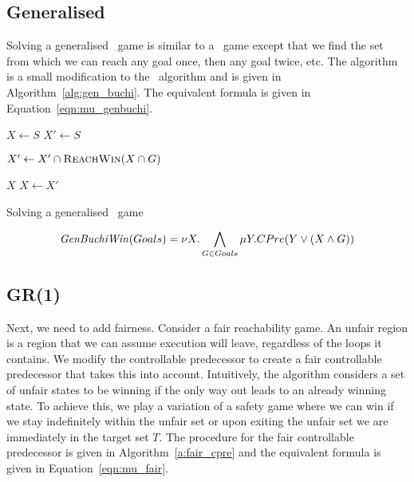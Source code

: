 \subsection{Generalised \buchi}

Solving a generalised \buchi\ game is similar to a \buchi\ game except that we find the set from which we can reach any goal once, then any goal twice, etc. The algorithm is a small modification to the \buchi\ algorithm and is given in Algorithm~\ref{alg:gen_buchi}. The equivalent \mucalc formula is given in Equation~\ref{eqn:mu_genbuchi}.

\begin{algorithm}[t]
\begin{algorithmic}
\State $X \gets S$
\Loop
\State $X' \gets S$

\State $X' \gets X' \cap \Call{\reachFun}{X \cap G}$
\EndFor

\State\Return $X$\EndIf
\State $X \gets X'$

\EndLoop
\EndFunction
\end{algorithmic}
\caption{Solving a generalised \buchi\ game}
\label{alg:gen_buchi}
\end{algorithm}

\begin{equation}
    \mathit{GenBuchiWin}(Goals) = \nu X. \bigwedge_{G \in Goals} \mu Y. CPre(Y \vee (X \wedge G))
\label{eqn:mu_genbuchi}
\end{equation}

\subsection{GR(1)}

Next, we need to add fairness. Consider a fair reachability game. An unfair region is a region that we can assume execution will leave, regardless of the loops it contains. We modify the controllable predecessor to create a fair controllable predecessor that takes this into account. Intuitively, the algorithm considers a set of unfair states to be winning if the only way out leads to an already winning state. To achieve this, we play a variation of a safety game where we can win if we stay indefinitely within the unfair set or upon exiting the unfair set we are immediately in the target set $T$. The procedure for the fair controllable predecessor is given in Algorithm~\ref{a:fair_cpre} and the equivalent \mucalc formula is given in Equation~\ref{eqn:mu_fair}. 

